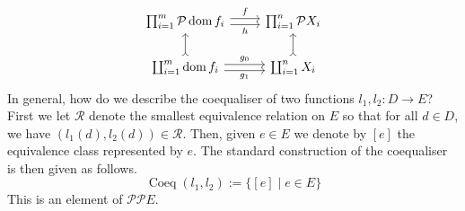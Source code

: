 \documentclass{birkjour}
\theoremstyle{plain}
\theoremstyle{definition}
\newcommand{\call}[1]{\mathcal{#1}}
\newcommand{\lto}{\longrightarrow}
\begin{document}
	\begin{equation}\label{eq:product_diag_set}
		\begin{tikzcd}
			\prod_{i = 1}^m \call{P}\operatorname{dom}f_i\arrow[r,shift left, "{f}"]\arrow[r,shift right, swap, "{h}"] & \prod_{i  =1}^n \call{P} X_i\\
			\coprod_{i = 1}^m \operatorname{dom}f_i\arrow[r,shift left, "{g_0}"]\arrow[r,shift right, swap, "{g_1}"]\arrow[u,rightarrowtail] & \coprod_{i = 1}^n X_i\arrow[u,rightarrowtail]
		\end{tikzcd}
	\end{equation}
	In general, how do we describe the coequaliser of two functions $l_1,l_2: D \lto E$? First we let $\call{R}$ denote the smallest equivalence relation on $E$ so that for all $d \in D$, we have $(l_1(d),l_2(d)) \in \call{R}$. Then, given $e \in E$ we denote by $[e]$ the equivalence class represented by $e$. The standard construction of the coequaliser is then given as follows.
	\begin{equation}
		\operatorname{Coeq}(l_1,l_2) := \lbrace [e] \mid e \in E\rbrace
	\end{equation}
	This is an element of $\call{P}\call{P}E$.
	
\end{document}
